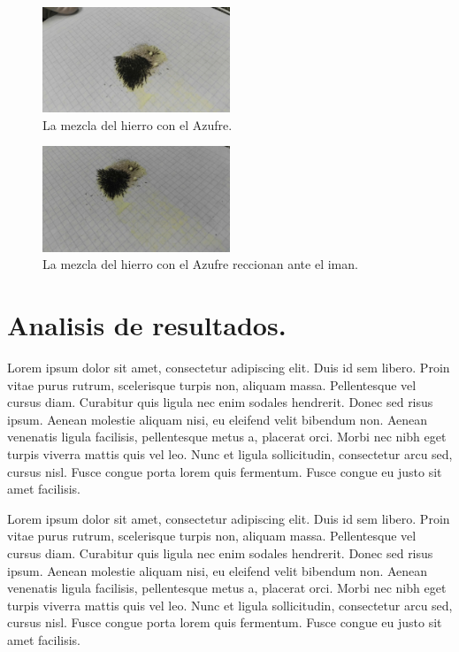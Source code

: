 \documentclass[letter]{article}
\begin{document}
	
\begin{figure}
		
	\centering	
	\includegraphics[width=0.5\textwidth]{obs1}
	\caption{La mezcla del hierro con el Azufre.}
	\label{fig:obs1}
\end{figure}
\begin{figure}
	\centering	
	\includegraphics[width=0.5\textwidth]{obs2}
	\caption{La mezcla del hierro con el Azufre reccionan ante el iman.}
	\label{fig:obs2}
\end{figure}

\section{Analisis de resultados.}
Lorem ipsum dolor sit amet, consectetur adipiscing elit. Duis id sem libero. Proin vitae purus rutrum, scelerisque turpis non, aliquam massa. Pellentesque vel cursus diam. Curabitur quis ligula nec enim sodales hendrerit. Donec sed risus ipsum. Aenean molestie aliquam nisi, eu eleifend velit bibendum non. Aenean venenatis ligula facilisis, pellentesque metus a, placerat orci. Morbi nec nibh eget turpis viverra mattis quis vel leo. Nunc et ligula sollicitudin, consectetur arcu sed, cursus nisl. Fusce congue porta lorem quis fermentum. Fusce congue eu justo sit amet facilisis.\par
Lorem ipsum dolor sit amet, consectetur adipiscing elit. Duis id sem libero. Proin vitae purus rutrum, scelerisque turpis non, aliquam massa. Pellentesque vel cursus diam. Curabitur quis ligula nec enim sodales hendrerit. Donec sed risus ipsum. Aenean molestie aliquam nisi, eu eleifend velit bibendum non. Aenean venenatis ligula facilisis, pellentesque metus a, placerat orci. Morbi nec nibh eget turpis viverra mattis quis vel leo. Nunc et ligula sollicitudin, consectetur arcu sed, cursus nisl. Fusce congue porta lorem quis fermentum. Fusce congue eu justo sit amet facilisis.\par



\end{document}
